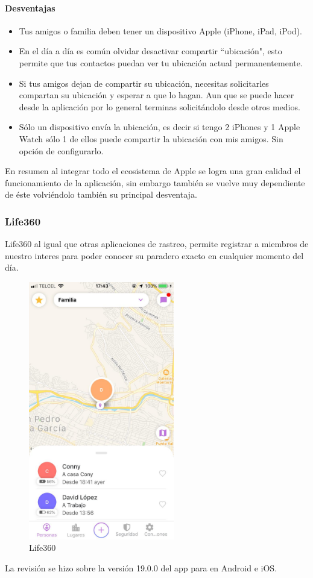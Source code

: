 \paragraph{Desventajas}

\begin{itemize}
\item Tus amigos o familia deben tener un dispositivo Apple (iPhone, iPad, iPod).
\item En el día a día es común olvidar desactivar compartir ``ubicación", esto permite que tus contactos puedan ver tu ubicación actual permanentemente.
\item Si tus amigos dejan de compartir su ubicación, necesitas solicitarles compartan su ubicación y esperar a que lo hagan. Aun que se puede hacer desde la aplicación por lo general terminas solicitándolo desde otros medios.
\item Sólo un dispositivo envía la ubicación, es decir si tengo 2 iPhones y 1 Apple Watch sólo 1 de ellos puede compartir la ubicación con mis amigos. Sin opción de configurarlo.
\end{itemize}

En resumen al integrar todo el ecosistema de Apple se logra una gran calidad el funcionamiento de la aplicación, sin embargo también se vuelve muy dependiente de éste volviéndolo también su principal desventaja.

\subsubsection{Life360}

Life360 al igual que otras aplicaciones de rastreo, permite registrar a miembros de nuestro interes para poder conocer su paradero exacto en cualquier momento del día. 

\begin{figure}[bp!]
	\centering
	\includegraphics[width=2.5in]{imgs/life360}
	  \caption{Life360}
\end{figure}
La revisión se hizo sobre la versión 19.0.0 del app para en Android e iOS.

